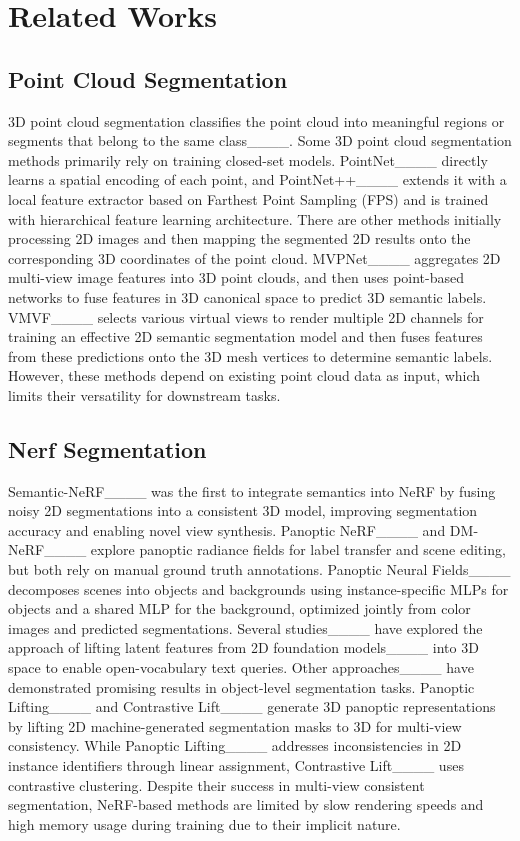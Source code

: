 \section{Related Works}
\subsection{Point Cloud Segmentation}
3D point cloud segmentation classifies the point cloud into meaningful regions or segments that belong to the same class____. Some 3D point cloud segmentation methods primarily rely on training closed-set models. PointNet____ directly learns a spatial encoding of each point, and PointNet++____ extends it with a local feature extractor based on Farthest Point Sampling (FPS) and is trained with hierarchical feature learning architecture. There are other methods initially processing 2D images and then mapping the segmented 2D results onto the corresponding 3D coordinates of the point cloud. MVPNet____ aggregates 2D multi-view image features into 3D point clouds, and then uses point-based networks to fuse features in 3D canonical space to predict 3D semantic labels. VMVF____ selects various virtual views to render multiple 2D channels for training an effective 2D semantic segmentation model and then fuses features from these predictions onto the 3D mesh vertices to determine semantic labels. However, these methods depend on existing point cloud data as input, which limits their versatility for downstream tasks.
\subsection{Nerf Segmentation}
Semantic-NeRF____ was the first to integrate semantics into NeRF by fusing noisy 2D segmentations into a consistent 3D model, improving segmentation accuracy and enabling novel view synthesis. Panoptic NeRF____ and DM-NeRF____ explore panoptic radiance fields for label transfer and scene editing, but both rely on manual ground truth annotations. Panoptic Neural Fields____ decomposes scenes into objects and backgrounds using instance-specific MLPs for objects and a shared MLP for the background, optimized jointly from color images and predicted segmentations.
Several studies____ have explored the approach of lifting latent features from 2D foundation models____ into 3D space to enable open-vocabulary text queries. Other approaches____ have demonstrated promising results in object-level segmentation tasks. Panoptic Lifting____ and Contrastive Lift____ generate 3D panoptic representations by lifting 2D machine-generated segmentation masks to 3D for multi-view consistency. While Panoptic Lifting____ addresses inconsistencies in 2D instance identifiers through linear assignment, Contrastive Lift____ uses contrastive clustering. Despite their success in multi-view consistent segmentation, NeRF-based methods are limited by slow rendering speeds and high memory usage during training due to their implicit nature.

